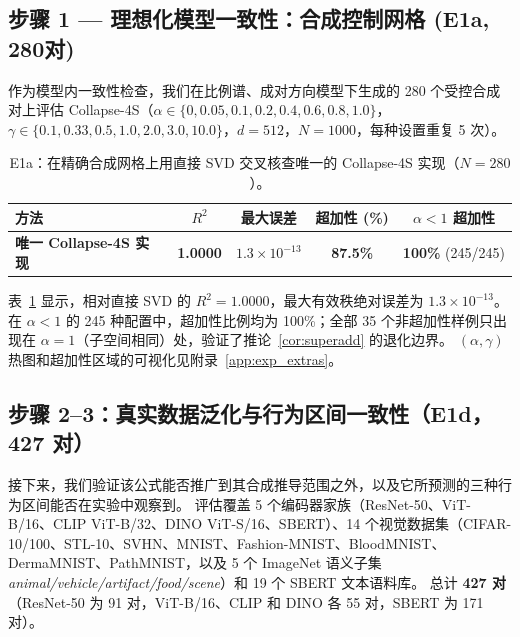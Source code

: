 \documentclass{article}
\begin{document}
\subsection{步骤 1 --- 理想化模型一致性：合成控制网格 (E1a, 280对)}
\label{sec:e1a_main}

作为模型内一致性检查，我们在比例谱、成对方向模型下生成的 280 个受控合成对上评估 Collapse-4S（$\alpha\in\{0,0.05,0.1,0.2,0.4,0.6,0.8,1.0\}$，$\gamma\in\{0.1,0.33,0.5,1.0,2.0,3.0,10.0\}$，$d{=}512$，$N{=}1000$，每种设置重复 5 次）。

\begin{table}[t]
\centering
\caption{E1a：在精确合成网格上用直接 SVD 交叉核查唯一的 Collapse-4S 实现（$N=280$）。}
\label{tab:e1a}
\begin{tabular}{lcccc}
\toprule
方法 & $R^2$ & 最大误差 & 超加性 (\%) & $\alpha<1$ 超加性 \\
\midrule
\textbf{唯一 Collapse-4S 实现} & \textbf{1.0000} & \textbf{$1.3{\times}10^{-13}$} & \textbf{87.5\%} & \textbf{100\%} (245/245) \\
\bottomrule
\end{tabular}
\end{table}
表~\ref{tab:e1a} 显示，相对直接 SVD 的 $R^2{=}1.0000$，最大有效秩绝对误差为 $1.3{\times}10^{-13}$。
在 $\alpha{<}1$ 的 245 种配置中，超加性比例均为 100\%；全部 35 个非超加性样例只出现在 $\alpha{=}1$（子空间相同）处，验证了推论~\ref{cor:superadd} 的退化边界。
$(\alpha,\gamma)$ 热图和超加性区域的可视化见附录~\ref{app:exp_extras}。

\subsection{步骤 2--3：真实数据泛化与行为区间一致性（E1d，427 对）}
\label{sec:e1d}

接下来，我们验证该公式能否推广到其合成推导范围之外，以及它所预测的三种行为区间能否在实验中观察到。
评估覆盖 5 个编码器家族（ResNet-50、ViT-B/16、CLIP ViT-B/32、DINO ViT-S/16、SBERT）、14 个视觉数据集（CIFAR-10/100、STL-10、SVHN、MNIST、Fashion-MNIST、BloodMNIST、DermaMNIST、PathMNIST，以及 5 个 ImageNet 语义子集 \emph{animal/vehicle/artifact/food/scene}）和 19 个 SBERT 文本语料库。
总计 \textbf{427 对}（ResNet-50 为 91 对，ViT-B/16、CLIP 和 DINO 各 55 对，SBERT 为 171 对）。
\end{document}
